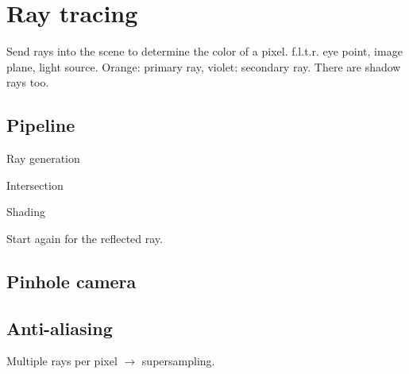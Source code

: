 \chapter{Ray tracing}
Send rays into the scene to determine the color of a pixel.
f.l.t.r. eye point, image plane, light source. Orange: primary ray, violet: secondary ray. There are shadow rays too.
\section{Pipeline}
\begin{enumerate*}[label=\protect\circled{\arabic*},itemjoin=]
	\item Ray generation\\
	\item Intersection\\
	\item Shading
\end{enumerate*}
Start again for the reflected ray.
\section{Pinhole camera}
\section{Anti-aliasing}
Multiple rays per pixel $\to$ supersampling.
